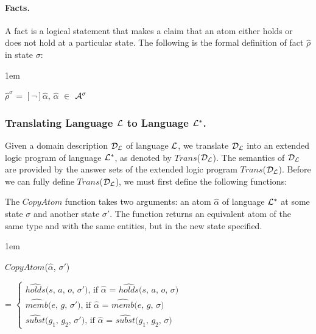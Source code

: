 \documentclass[global,twocolumn,final]{svjour}
\newenvironment{vquote}
  {\begin{list}{}{\leftmargin 1em}\item[]}
  {\end{list}}
\begin{document}
        \paragraph{Facts.}

          A fact is a logical statement that makes a claim that an atom either
          holds or does not hold at a particular state. The following is the
          formal definition of fact $\hat{\rho}$ in state $\sigma$:

          \begin{vquote}
            $\hat{\rho}^{\sigma}$ =
            $[\lnot]$$\hat{\alpha}$, $\hat{\alpha}$ $\in$ ${\cal A}^{\sigma}$
          \end{vquote}

      \subsubsection{Translating Language ${\cal L}$ to Language ${\cal L^{*}}$.}

        Given a domain description ${\cal D_{L}}$ of language ${\cal L}$, we
        translate ${\cal D_{L}}$ into an extended logic program of language
        ${\cal L^{*}}$, as denoted by $Trans$(${\cal D_{L}}$). The semantics of
        ${\cal D_{L}}$ are provided by the answer sets of the extended logic
        program $Trans$(${\cal D_{L}}$). Before we can fully define
        $Trans$(${\cal D}_{\cal L}$), we must first define the following
        functions:

        The $CopyAtom$ function takes two arguments: an atom $\hat{\alpha}$
        of language ${\cal L}^{*}$ at some state $\sigma$ and another state
        $\sigma'$. The function returns an equivalent atom of the same type
        and with the same entities, but in the new state specified.

        \begin{vquote}
          $CopyAtom$($\hat{\alpha}$, $\sigma'$)

          \hspace{1em}
          =
          \begin{math}
            \begin{cases}
              \mbox{$\hat{holds}$($s$, $a$, $o$, $\sigma'$), if $\hat{\alpha}$ = $\hat{holds}$($s$, $a$, $o$, $\sigma$)} \\
              \mbox{$\hat{memb}$($e$, $g$, $\sigma'$), if $\hat{\alpha}$ = $\hat{memb}$($e$, $g$, $\sigma$)} \\
              \mbox{$\hat{subst}$($g_{1}$, $g_{2}$, $\sigma'$), if $\hat{\alpha}$ = $\hat{subst}$($g_{1}$, $g_{2}$, $\sigma$)}
            \end{cases}
          \end{math}
        \end{vquote}
\end{document}

